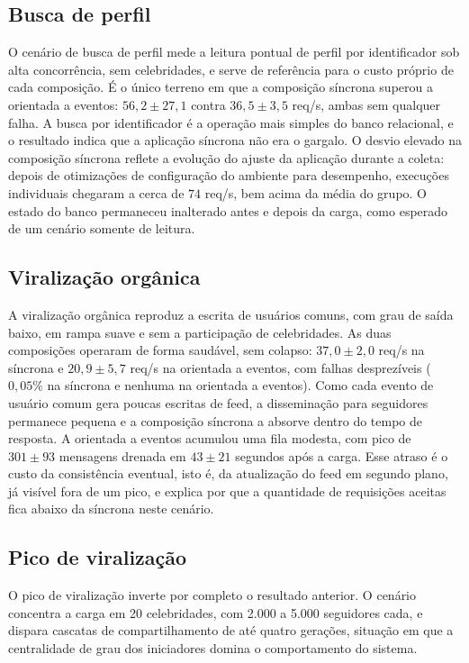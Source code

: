 \estrutura\subsection{\esp Busca de perfil}

O cenário de busca de perfil mede a leitura pontual de perfil por identificador sob alta concorrência, sem celebridades, e serve de referência para o custo próprio de cada composição. É o único terreno em que a composição síncrona superou a orientada a eventos: $56{,}2 \pm 27{,}1$ contra $36{,}5 \pm 3{,}5$ req/s, ambas sem qualquer falha. A busca por identificador é a operação mais simples do banco relacional, e o resultado indica que a aplicação síncrona não era o gargalo. O desvio elevado na composição síncrona reflete a evolução do ajuste da aplicação durante a coleta: depois de otimizações de configuração do ambiente para desempenho, execuções individuais chegaram a cerca de $74$ req/s, bem acima da média do grupo. O estado do banco permaneceu inalterado antes e depois da carga, como esperado de um cenário somente de leitura.

\estrutura\subsection{\esp Viralização orgânica}

A viralização orgânica reproduz a escrita de usuários comuns, com grau de saída baixo, em rampa suave e sem a participação de celebridades. As duas composições operaram de forma saudável, sem colapso: $37{,}0 \pm 2{,}0$ req/s na síncrona e $20{,}9 \pm 5{,}7$ req/s na orientada a eventos, com falhas desprezíveis ($0{,}05\%$ na síncrona e nenhuma na orientada a eventos). Como cada evento de usuário comum gera poucas escritas de feed, a disseminação para seguidores permanece pequena e a composição síncrona a absorve dentro do tempo de resposta. A orientada a eventos acumulou uma fila modesta, com pico de $301 \pm 93$ mensagens drenada em $43 \pm 21$ segundos após a carga. Esse atraso é o custo da consistência eventual, isto é, da atualização do feed em segundo plano, já visível fora de um pico, e explica por que a quantidade de requisições aceitas fica abaixo da síncrona neste cenário.

\estrutura\subsection{\esp Pico de viralização}

O pico de viralização inverte por completo o resultado anterior. O cenário concentra a carga em 20 celebridades, com 2.000 a 5.000 seguidores cada, e dispara cascatas de compartilhamento de até quatro gerações, situação em que a centralidade de grau dos iniciadores domina o comportamento do sistema.

